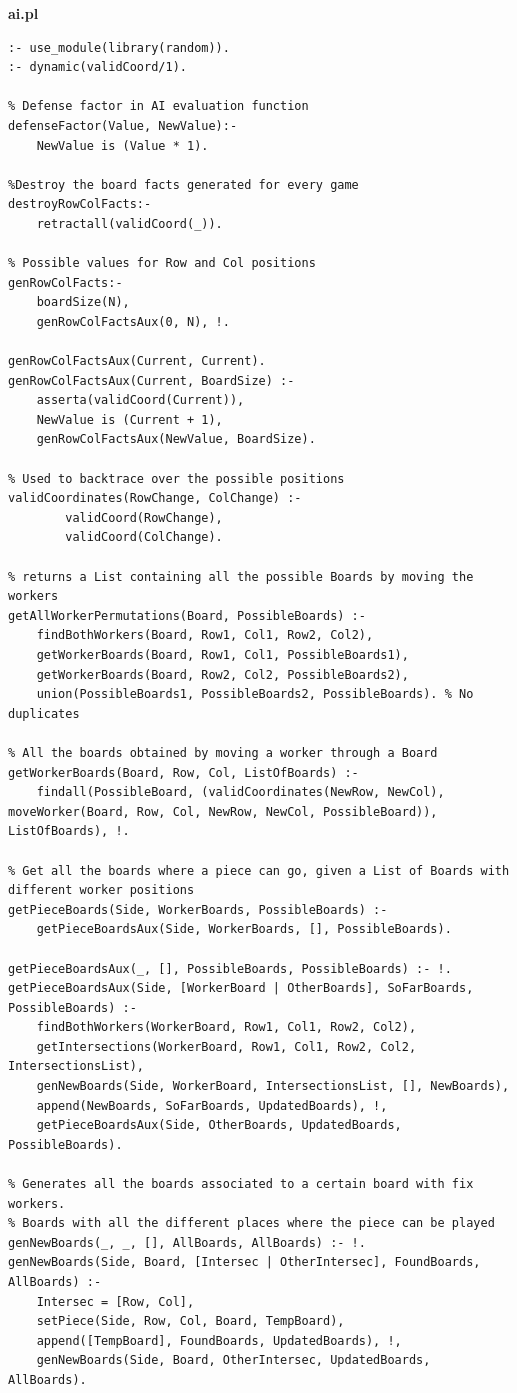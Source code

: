 \documentclass[a4paper]{article}
\begin{document}
\huge\textbf{ai.pl}
\begin{lstlisting}
:- use_module(library(random)).
:- dynamic(validCoord/1).

% Defense factor in AI evaluation function
defenseFactor(Value, NewValue):-
	NewValue is (Value * 1).

%Destroy the board facts generated for every game
destroyRowColFacts:-
	retractall(validCoord(_)). 

% Possible values for Row and Col positions
genRowColFacts:-
	boardSize(N),
	genRowColFactsAux(0, N), !.

genRowColFactsAux(Current, Current).
genRowColFactsAux(Current, BoardSize) :-
	asserta(validCoord(Current)),
	NewValue is (Current + 1),
	genRowColFactsAux(NewValue, BoardSize).

% Used to backtrace over the possible positions
validCoordinates(RowChange, ColChange) :-
        validCoord(RowChange),
        validCoord(ColChange).

% returns a List containing all the possible Boards by moving the workers
getAllWorkerPermutations(Board, PossibleBoards) :-
	findBothWorkers(Board, Row1, Col1, Row2, Col2),
	getWorkerBoards(Board, Row1, Col1, PossibleBoards1),
	getWorkerBoards(Board, Row2, Col2, PossibleBoards2),
	union(PossibleBoards1, PossibleBoards2, PossibleBoards). % No duplicates

% All the boards obtained by moving a worker through a Board
getWorkerBoards(Board, Row, Col, ListOfBoards) :-
	findall(PossibleBoard, (validCoordinates(NewRow, NewCol), moveWorker(Board, Row, Col, NewRow, NewCol, PossibleBoard)), ListOfBoards), !.

% Get all the boards where a piece can go, given a List of Boards with different worker positions
getPieceBoards(Side, WorkerBoards, PossibleBoards) :-
	getPieceBoardsAux(Side, WorkerBoards, [], PossibleBoards).

getPieceBoardsAux(_, [], PossibleBoards, PossibleBoards) :- !.
getPieceBoardsAux(Side, [WorkerBoard | OtherBoards], SoFarBoards, PossibleBoards) :-
	findBothWorkers(WorkerBoard, Row1, Col1, Row2, Col2),
	getIntersections(WorkerBoard, Row1, Col1, Row2, Col2, IntersectionsList),
	genNewBoards(Side, WorkerBoard, IntersectionsList, [], NewBoards),
	append(NewBoards, SoFarBoards, UpdatedBoards), !,
	getPieceBoardsAux(Side, OtherBoards, UpdatedBoards, PossibleBoards).

% Generates all the boards associated to a certain board with fix workers.
% Boards with all the different places where the piece can be played
genNewBoards(_, _, [], AllBoards, AllBoards) :- !.
genNewBoards(Side, Board, [Intersec | OtherIntersec], FoundBoards, AllBoards) :-
	Intersec = [Row, Col],
	setPiece(Side, Row, Col, Board, TempBoard),
	append([TempBoard], FoundBoards, UpdatedBoards), !,
	genNewBoards(Side, Board, OtherIntersec, UpdatedBoards, AllBoards).


\end{lstlisting}
\end{document}
